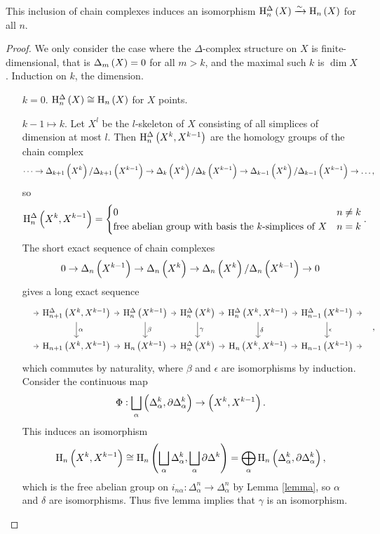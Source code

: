 \begin{theorem}
This inclusion of chain complexes induces an isomorphism $ \H_n^\Delta\br{X} \xrightarrow{\sim} \H_n\br{X} $ for all $ n $.
\end{theorem}

\begin{proof}
We only consider the case where the $ \Delta $-complex structure on $ X $ is finite-dimensional, that is $ \Delta_m\br{X} = 0 $ for all $ m > k $, and the maximal such $ k $ is $ \dim X $. Induction on $ k $, the dimension.
\begin{itemize}[leftmargin=0.5in]
\item[$ k = 0 $.] $ \H_n^\Delta\br{X} \cong \H_n\br{X} $ for $ X $ points.
\item[$ k - 1 \mapsto k $.] Let $ X^l $ be the $ l $-skeleton of $ X $ consisting of all simplices of dimension at most $ l $. Then $ \H_n^\Delta\br{X^k, X^{k - 1}} $ are the homology groups of the chain complex
$$ \dots \to \Delta_{k + 1}\br{X^k} / \Delta_{k + 1}\br{X^{k - 1}} \to \Delta_k\br{X^k} / \Delta_k\br{X^{k - 1}} \to \Delta_{k - 1}\br{X^k} / \Delta_{k - 1}\br{X^{k - 1}} \to \dots, $$
so
$$ \H_n^\Delta\br{X^k, X^{k - 1}} =
\begin{cases}
0 & n \ne k \\
\text{free abelian group with basis the $ k $-simplices of} \ X & n = k
\end{cases}.
$$
The short exact sequence of chain complexes
$$ 0 \to \Delta_n\br{X^{k - 1}} \to \Delta_n\br{X^k} \to \Delta_n\br{X^k} / \Delta_n\br{X^{k - 1}} \to 0 $$
gives a long exact sequence
$$
\begin{tikzcd}[column sep=tiny]
\ \arrow{r} & \H_{n + 1}^\Delta\br{X^k, X^{k - 1}} \arrow{r} \arrow{d}{\alpha} & \H_n^\Delta\br{X^{k - 1}} \arrow{r} \arrow{d}{\beta} & \H_n^\Delta\br{X^k} \arrow{r} \arrow{d}{\gamma} & \H_n^\Delta\br{X^k, X^{k - 1}} \arrow{r} \arrow{d}{\delta} & \H_{n - 1}^\Delta\br{X^{k - 1}} \arrow{d}{\epsilon} \arrow{r} & \ \\
\ \arrow{r} & \H_{n + 1}\br{X^k, X^{k - 1}} \arrow{r} & \H_n\br{X^{k - 1}} \arrow{r} & \H_n^\Delta\br{X^k} \arrow{r} & \H_n\br{X^k, X^{k - 1}} \arrow{r} & \H_{n - 1}\br{X^{k - 1}} \arrow{r} & \
\end{tikzcd},
$$
which commutes by naturality, where $ \beta $ and $ \epsilon $ are isomorphisms by induction. Consider the continuous map
$$ \Phi : \bigsqcup_\alpha \br{\Delta_\alpha^k, \da\Delta_\alpha^k} \to \br{X^k, X^{k - 1}}. $$
This induces an isomorphism
$$ \H_n\br{X^k, X^{k - 1}} \cong \H_n\br{\bigsqcup_\alpha \Delta_\alpha^k, \bigsqcup_\alpha \da\Delta^k} = \bigoplus_\alpha \H_n\br{\Delta_\alpha^k, \da\Delta_\alpha^k}, $$
which is the free abelian group on $ i_{n\alpha} : \Delta_\alpha^n \to \Delta_\alpha^n $ by Lemma \ref{lemma}, so $ \alpha $ and $ \delta $ are isomorphisms. Thus five lemma implies that $ \gamma $ is an isomorphism.
\end{itemize}
\end{proof}

